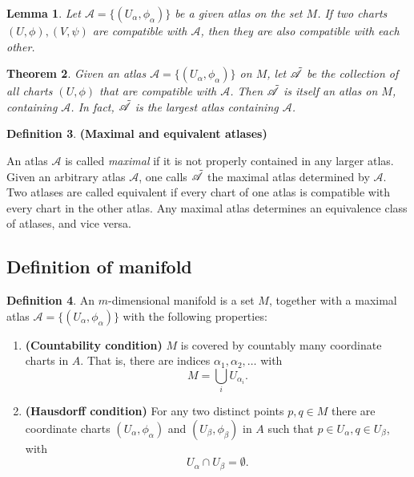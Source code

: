 \documentclass{article}
\newtheorem{theorem}{Theorem}[section]
\newtheorem{lemma}[theorem]{Lemma}
\theoremstyle{definition}
\newtheorem{defn}[theorem]{Definition}
\newenvironment{definition}
  {\vspace{8pt}\begin{mdframed}[backgroundcolor=blueish,innertopmargin=4]\begin{defn}}
  {\end{defn}\end{mdframed}\vspace{4pt}}
\begin{document}
\begin{lemma}

Let $\mathscr{A} =  \{(U_\alpha, \phi_\alpha) \}$ be a given atlas on the set $M$. If two charts $(U,\phi), (V,\psi)$ are compatible with $\mathscr{A}$, then they are also compatible with each other.
\end{lemma}

\begin{theorem}

Given an atlas $\mathscr{A} =  \{(U_\alpha, \phi_\alpha) \}$ on $M$, let $\Tilde{\mathscr{A}}$ be the collection of all charts $(U,\phi)$ that are compatible with $\mathscr{A}$. Then $\Tilde{\mathscr{A}}$ is itself an atlas on $M$, containing $\mathscr{A}$. In fact, $\Tilde{\mathscr{A}}$ is the largest atlas containing $\mathscr{A}$.
\end{theorem}

\begin{definition} \textbf{(Maximal and equivalent atlases)}

An atlas $\mathscr{A}$ is called \textit{maximal} if it is not properly contained in any larger atlas. Given an arbitrary atlas $\mathscr{A}$, one calls $\Tilde{\mathscr{A}}$ the maximal
atlas determined by $\mathscr{A}$.  Two atlases are called equivalent if every chart of one atlas is compatible with every chart in the other atlas. Any maximal atlas determines an equivalence class of atlases, and vice versa.
\end{definition}


\subsection{Definition of manifold}

\begin{definition}
An $m$-dimensional manifold is a set $M$, together with a maximal atlas $\mathscr{A} =  \{(U_\alpha, \phi_\alpha) \}$ with the following properties: 
\begin{enumerate}
    \item \textbf{(Countability condition)} $M$ is covered by countably many coordinate charts in $A$. That is, there are indices $\alpha_1, \alpha_2, \dots$ with
    \[
        M = \bigcup_i U_{\alpha_i}.
    \]
    \item \textbf{(Hausdorff condition)} For any two distinct points $p,q \in M$ there are coordinate charts $(U_\alpha, \phi_\alpha)$ and $(U_\beta, \phi_\beta)$ in $A$ such that $p \in U_\alpha, q \in U_\beta$, with
    \[
        U_\alpha \cap U_\beta = \emptyset.
    \]
\end{enumerate}
\end{definition}
\end{document}
